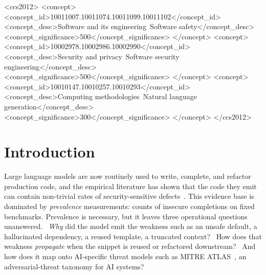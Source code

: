 \documentclass[sigconf,review,anonymous=false]{acmart}
\begin{document}
\begin{CCSXML}
<ccs2012>
   <concept>
       <concept_id>10011007.10011074.10011099.10011102</concept_id>
       <concept_desc>Software and its engineering~Software safety</concept_desc>
       <concept_significance>500</concept_significance>
   </concept>
   <concept>
       <concept_id>10002978.10002986.10002990</concept_id>
       <concept_desc>Security and privacy~Software security engineering</concept_desc>
       <concept_significance>500</concept_significance>
   </concept>
   <concept>
       <concept_id>10010147.10010257.10010293</concept_id>
       <concept_desc>Computing methodologies~Natural language generation</concept_desc>
       <concept_significance>300</concept_significance>
   </concept>
</ccs2012>
\end{CCSXML}



\maketitle

\section{Introduction}

Large language models are now routinely used to write, complete, and
refactor production code, and the empirical literature has shown that the code they emit can contain non-trivial rates of security-sensitive defects~\cite{pearce2022asleep,khoury2023copilot,siddiq2022securityeval}.
This evidence base is dominated by \emph{prevalence} measurements:
counts of insecure completions on fixed benchmarks. Prevalence is
necessary, but it leaves three operational questions unanswered.
~\emph{Why} did the model emit the weakness such as an unsafe default, a
hallucinated dependency, a reused template, a truncated context? ~How
does that weakness \emph{propagate} when the snippet is reused or
refactored downstream? ~And how does it map onto AI-specific threat
models such as MITRE ATLAS~\cite{mitreatlas}, an adversarial-threat taxonomy for AI systems?
\end{document}
